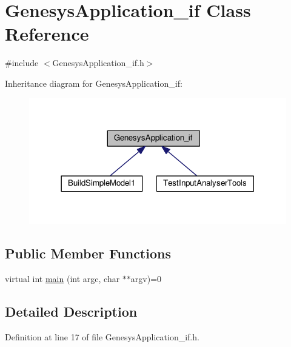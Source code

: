 \hypertarget{class_genesys_application__if}{\section{Genesys\-Application\-\_\-if Class Reference}
\label{class_genesys_application__if}
}


{\ttfamily \#include $<$Genesys\-Application\-\_\-if.\-h$>$}



Inheritance diagram for Genesys\-Application\-\_\-if\-:
\nopagebreak
\begin{figure}[H]
\begin{center}
\leavevmode
\includegraphics[width=318pt]{class_genesys_application__if__inherit__graph}
\end{center}
\end{figure}
\subsection*{Public Member Functions}
\begin{DoxyCompactItemize}
\item 
virtual int \hyperlink{class_genesys_application__if_a2b07e7803b410a4a8d0f87422dabb004}{main} (int argc, char $\ast$$\ast$argv)=0
\end{DoxyCompactItemize}


\subsection{Detailed Description}


Definition at line 17 of file Genesys\-Application\-\_\-if.\-h.



